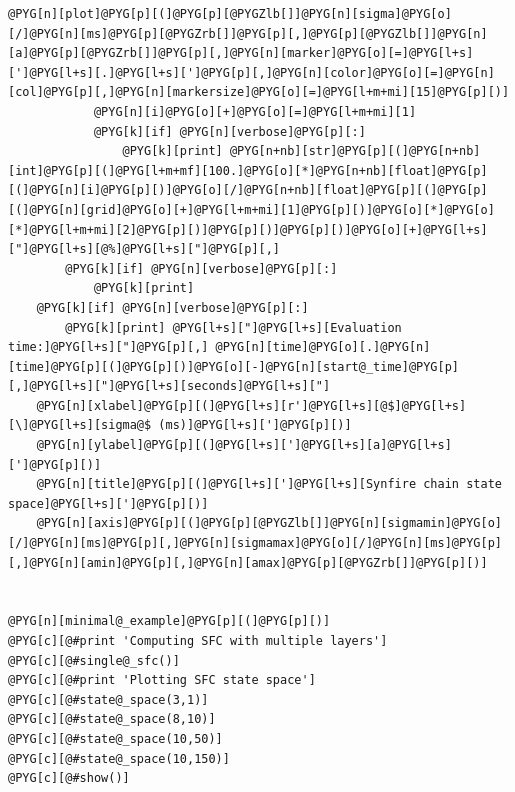 \documentclass[letterpaper,10pt,english]{manual}
\begin{document}
\begin{Verbatim}[commandchars=@\[\]]
            @PYG[n][plot]@PYG[p][(]@PYG[p][@PYGZlb[]]@PYG[n][sigma]@PYG[o][/]@PYG[n][ms]@PYG[p][@PYGZrb[]]@PYG[p][,]@PYG[p][@PYGZlb[]]@PYG[n][a]@PYG[p][@PYGZrb[]]@PYG[p][,]@PYG[n][marker]@PYG[o][=]@PYG[l+s][']@PYG[l+s][.]@PYG[l+s][']@PYG[p][,]@PYG[n][color]@PYG[o][=]@PYG[n][col]@PYG[p][,]@PYG[n][markersize]@PYG[o][=]@PYG[l+m+mi][15]@PYG[p][)]
            @PYG[n][i]@PYG[o][+]@PYG[o][=]@PYG[l+m+mi][1]
            @PYG[k][if] @PYG[n][verbose]@PYG[p][:]
                @PYG[k][print] @PYG[n+nb][str]@PYG[p][(]@PYG[n+nb][int]@PYG[p][(]@PYG[l+m+mf][100.]@PYG[o][*]@PYG[n+nb][float]@PYG[p][(]@PYG[n][i]@PYG[p][)]@PYG[o][/]@PYG[n+nb][float]@PYG[p][(]@PYG[p][(]@PYG[n][grid]@PYG[o][+]@PYG[l+m+mi][1]@PYG[p][)]@PYG[o][*]@PYG[o][*]@PYG[l+m+mi][2]@PYG[p][)]@PYG[p][)]@PYG[p][)]@PYG[o][+]@PYG[l+s]["]@PYG[l+s][@%]@PYG[l+s]["]@PYG[p][,]
        @PYG[k][if] @PYG[n][verbose]@PYG[p][:]
            @PYG[k][print]
    @PYG[k][if] @PYG[n][verbose]@PYG[p][:]
        @PYG[k][print] @PYG[l+s]["]@PYG[l+s][Evaluation time:]@PYG[l+s]["]@PYG[p][,] @PYG[n][time]@PYG[o][.]@PYG[n][time]@PYG[p][(]@PYG[p][)]@PYG[o][-]@PYG[n][start@_time]@PYG[p][,]@PYG[l+s]["]@PYG[l+s][seconds]@PYG[l+s]["]
    @PYG[n][xlabel]@PYG[p][(]@PYG[l+s][r']@PYG[l+s][@$]@PYG[l+s][\]@PYG[l+s][sigma@$ (ms)]@PYG[l+s][']@PYG[p][)]
    @PYG[n][ylabel]@PYG[p][(]@PYG[l+s][']@PYG[l+s][a]@PYG[l+s][']@PYG[p][)]
    @PYG[n][title]@PYG[p][(]@PYG[l+s][']@PYG[l+s][Synfire chain state space]@PYG[l+s][']@PYG[p][)]
    @PYG[n][axis]@PYG[p][(]@PYG[p][@PYGZlb[]]@PYG[n][sigmamin]@PYG[o][/]@PYG[n][ms]@PYG[p][,]@PYG[n][sigmamax]@PYG[o][/]@PYG[n][ms]@PYG[p][,]@PYG[n][amin]@PYG[p][,]@PYG[n][amax]@PYG[p][@PYGZrb[]]@PYG[p][)]


@PYG[n][minimal@_example]@PYG[p][(]@PYG[p][)]
@PYG[c][@#print 'Computing SFC with multiple layers']
@PYG[c][@#single@_sfc()]
@PYG[c][@#print 'Plotting SFC state space']
@PYG[c][@#state@_space(3,1)]
@PYG[c][@#state@_space(8,10)]
@PYG[c][@#state@_space(10,50)]
@PYG[c][@#state@_space(10,150)]
@PYG[c][@#show()]
\end{Verbatim}

\resetcurrentobjects
\hypertarget{--doc-examples-frompapers_Izhikevich_2006_Polychronization}{}
\end{document}
